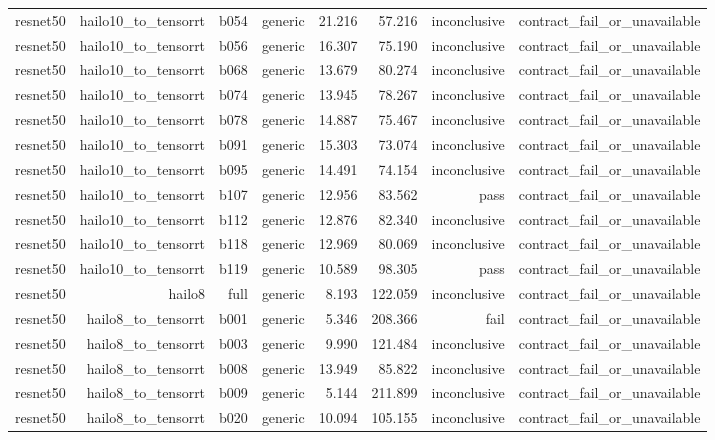 \begin{table}[t]
\begin{tabular}{lrrrrrrr}
resnet50 & hailo10\_to\_tensorrt & b054 & generic & 21.216 & 57.216 & inconclusive & contract\_fail\_or\_unavailable \\
resnet50 & hailo10\_to\_tensorrt & b056 & generic & 16.307 & 75.190 & inconclusive & contract\_fail\_or\_unavailable \\
resnet50 & hailo10\_to\_tensorrt & b068 & generic & 13.679 & 80.274 & inconclusive & contract\_fail\_or\_unavailable \\
resnet50 & hailo10\_to\_tensorrt & b074 & generic & 13.945 & 78.267 & inconclusive & contract\_fail\_or\_unavailable \\
resnet50 & hailo10\_to\_tensorrt & b078 & generic & 14.887 & 75.467 & inconclusive & contract\_fail\_or\_unavailable \\
resnet50 & hailo10\_to\_tensorrt & b091 & generic & 15.303 & 73.074 & inconclusive & contract\_fail\_or\_unavailable \\
resnet50 & hailo10\_to\_tensorrt & b095 & generic & 14.491 & 74.154 & inconclusive & contract\_fail\_or\_unavailable \\
resnet50 & hailo10\_to\_tensorrt & b107 & generic & 12.956 & 83.562 & pass & contract\_fail\_or\_unavailable \\
resnet50 & hailo10\_to\_tensorrt & b112 & generic & 12.876 & 82.340 & inconclusive & contract\_fail\_or\_unavailable \\
resnet50 & hailo10\_to\_tensorrt & b118 & generic & 12.969 & 80.069 & inconclusive & contract\_fail\_or\_unavailable \\
resnet50 & hailo10\_to\_tensorrt & b119 & generic & 10.589 & 98.305 & pass & contract\_fail\_or\_unavailable \\
resnet50 & hailo8 & full & generic & 8.193 & 122.059 & inconclusive & contract\_fail\_or\_unavailable \\
resnet50 & hailo8\_to\_tensorrt & b001 & generic & 5.346 & 208.366 & fail & contract\_fail\_or\_unavailable \\
resnet50 & hailo8\_to\_tensorrt & b003 & generic & 9.990 & 121.484 & inconclusive & contract\_fail\_or\_unavailable \\
resnet50 & hailo8\_to\_tensorrt & b008 & generic & 13.949 & 85.822 & inconclusive & contract\_fail\_or\_unavailable \\
resnet50 & hailo8\_to\_tensorrt & b009 & generic & 5.144 & 211.899 & inconclusive & contract\_fail\_or\_unavailable \\
resnet50 & hailo8\_to\_tensorrt & b020 & generic & 10.094 & 105.155 & inconclusive & contract\_fail\_or\_unavailable \\

\end{tabular}
\end{table}
